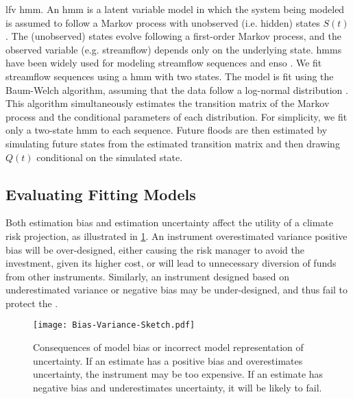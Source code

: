 \documentclass[
  draft,
  linenumbers
]{agujournal2019}
\begin{document}
 \gls{lfv}  \gls{hmm}.
An \gls{hmm} is a latent variable model in which the system being modeled is assumed to follow a Markov process with unobserved (i.e.\@\xspace hidden) states $S(t)$ \citep{Rabiner:1986jk}.
The (unobserved) states evolve following a first-order Markov process, and the observed variable (e.g.\@\xspace streamflow) depends only on the underlying state.
\Glspl{hmm} have been widely used for modeling streamflow sequences \citep{Bracken:2016ba} and \gls{enso} \citep{rojohernandez:2017}.
We fit  streamflow sequences using a \gls{hmm} with two states.
The model is fit using the Baum-Welch algorithm, assuming that the data follow a log-normal distribution .
This algorithm simultaneously estimates the transition matrix of the Markov process and the conditional parameters of each distribution.
For simplicity, we fit only a two-state \gls{hmm} to each sequence.
Future floods are then estimated by simulating future states from the estimated transition matrix and then drawing $Q(t)$ conditional on the simulated state.

\subsection{Evaluating Fitting Models}\label{sec:methods-evaluating}

Both estimation bias and estimation uncertainty affect the utility of a climate risk projection, as illustrated in \cref{fig:conceptual-bias-variance}.
An instrument   overestimated variance  positive bias will be over-designed, either causing the risk manager to avoid the investment, given its higher cost, or will lead to unnecessary diversion of funds from other instruments.
Similarly, an instrument designed based on underestimated variance or negative bias may be under-designed, and thus fail to protect the .
\begin{figure}
  \centering
  \texttt{[image: Bias-Variance-Sketch.pdf]}
  \caption{
    Consequences of model bias or incorrect model representation of uncertainty.
    If an estimate has a positive bias and overestimates uncertainty, the instrument may be too expensive.
    If an estimate has negative bias and underestimates uncertainty, it will be likely to fail.
  }\label{fig:conceptual-bias-variance}
\end{figure}
\end{document}
